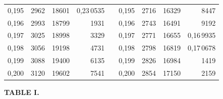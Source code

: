 \begin{tabular}{|c|c|c|r|@{}p{9pt}@{}|c|c|c|r|}
0,195 & 2962 & 18601 & 0,23\,0535 &  & 0,195 & 2716 & 16329 & 8447 \\[3pt]
0,196 & 2993 & 18799 & 1931 &  & 0,196 & 2743 & 16491 & 9192 \\
0,197 & 3025 & 18998 & 3329 &  & 0,197 & 2771 & 16655 & 0,16\,9935 \\
0,198 & 3056 & 19198 & 4731 &  & 0,198 & 2798 & 16819 & 0,17\,0678 \\
0,199 & 3088 & 19400 & 6135 &  & 0,199 & 2826 & 16984 & 1419 \\
0,200 & 3120 & 19602 & 7541 &  & 0,200 & 2854 & 17150 & 2159 \\
\hline
\end{tabular}\par
\endgroup
\clearpage
{}
\begingroup
\centering
\fontsize{9}{9}\selectfont
\setlength{\tabcolsep}{6pt}
\renewcommand{\arraystretch}{1}
\setlength{\parskip}{0pt}
\textbf{TABLE I.}
\par\vspace{7pt}
